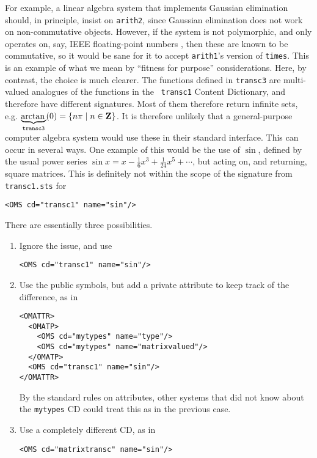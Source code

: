 \documentclass[keylogo]{openmath}
\begin{document}
For example, a linear algebra system that implements Gaussian elimination
should, in principle, insist on {\tt arith2}, since Gaussian elimination
does not work on non-commutative objects. However, if the system is not
polymorphic, and only operates on, say, IEEE floating-point numbers
\cite{IEEE}, then these are known to be commutative, so it would be sane
for it to accept {\tt arith1}'s version of {\tt times}. This is an example
of what we mean by ``fitness for purpose'' considerations.
\label{transc}
\def\arctanIII{\underbrace{\mathop{\rm arctan}\nolimits{}}_{\mathop{\tt
transc3}\nolimits}}
Here, by contrast, the choice is much clearer. The functions defined in
{\tt transc3} are multi-valued analogues of the functions in the {\tt
transc1} Content Dictionary, and therefore have different signatures. Most
of them therefore return infinite sets, e.g. $\arctanIII(0)=\{n\pi\mid
n\in{\bf Z}\}$. It is therefore unlikely that a general-purpose computer
algebra system would use these in their standard interface.
This can occur in several ways.
\label{matrixsin}
One example of this would be the use of $\sin$, defined by the usual power
series $\sin x = x -\frac16x^3+\frac1{24}x^5+\cdots$, but acting on, and
returning, square matrices. This is definitely not within the scope of the
signature from {\tt transc1.sts} \cite{STS} for
\begin{verbatim}
<OMS cd="transc1" name="sin"/>
\end{verbatim}
There are essentially three possibilities.
\begin{enumerate}
\item Ignore the issue, and use
\begin{verbatim}
<OMS cd="transc1" name="sin"/>
\end{verbatim}
\item Use the public symbols, but add a private attribute to keep track of
the difference, as in
\begin{verbatim}
<OMATTR>
  <OMATP>
    <OMS cd="mytypes" name="type"/>
    <OMS cd="mytypes" name="matrixvalued"/>
  </OMATP>
  <OMS cd="transc1" name="sin"/>
</OMATTR>
\end{verbatim}
By the standard rules on attributes, other systems that did not know about
the {\tt mytypes} CD could treat this as in the previous case.
\item Use a completely different CD, as in
\begin{verbatim}
<OMS cd="matrixtransc" name="sin"/>
\end{verbatim}
\end{enumerate}
\end{document}
